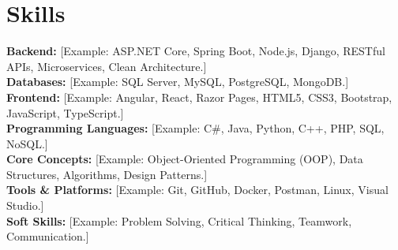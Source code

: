 \section*{Skills}

\textbf{Backend:} [Example: ASP.NET Core, Spring Boot, Node.js, Django, RESTful APIs, Microservices, Clean Architecture.] \\[3pt]

\textbf{Databases:} [Example: SQL Server, MySQL, PostgreSQL, MongoDB.] \\[3pt]

\textbf{Frontend:} [Example: Angular, React, Razor Pages, HTML5, CSS3, Bootstrap, JavaScript, TypeScript.] \\[3pt]

\textbf{Programming Languages:} [Example: C\#, Java, Python, C++, PHP, SQL, NoSQL.] \\[3pt]

\textbf{Core Concepts:} [Example: Object-Oriented Programming (OOP), Data Structures, Algorithms, Design Patterns.] \\[3pt]

\textbf{Tools \& Platforms:} [Example: Git, GitHub, Docker, Postman, Linux, Visual Studio.] \\[3pt]

\textbf{Soft Skills:} [Example: Problem Solving, Critical Thinking, Teamwork, Communication.]
